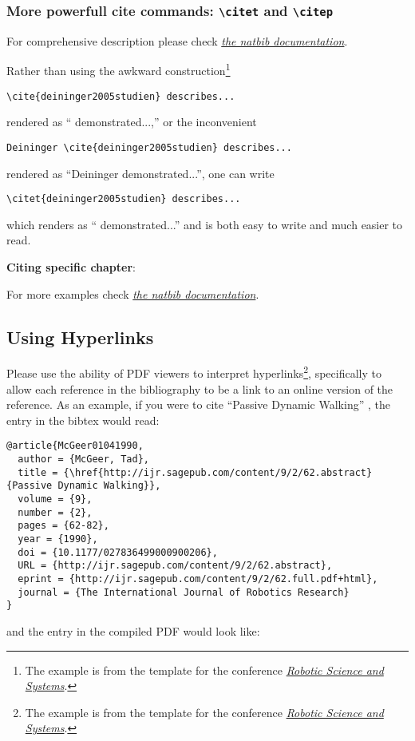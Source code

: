 \subsubsection{More powerfull cite commands: \texttt{\textbackslash citet} and \texttt{\textbackslash citep}}
For comprehensive description please check \href{http://merkel.texture.rocks/Latex/natbib.php}{\textit{the natbib documentation}}.

Rather than using the awkward construction\footnote{The example is from the template for the conference \href{http://www.roboticsconference.org/information/authorinfo/}{\textit{Robotic Science and Systems}}.}
{\small
\begin{verbatim}
\cite{deininger2005studien} describes...
\end{verbatim}
}
\noindent
rendered as ``\cite{deininger2005studien} demonstrated...,'' or the inconvenient
{\small
\begin{verbatim}
Deininger \cite{deininger2005studien} describes...
\end{verbatim}
}
\noindent
rendered as ``Deininger \cite{deininger2005studien} demonstrated...'', one can write
{\small
\begin{verbatim}
\citet{deininger2005studien} describes...
\end{verbatim}
}
\noindent
which renders as ``\citet{deininger2005studien} demonstrated...'' and is
both easy to write and much easier to read.


\textbf{Citing specific chapter}:

\citet[sec. III]{Kroger2008MultiSensor}

\citep[sec. III]{Kroger2008MultiSensor}

For more examples check \href{http://merkel.texture.rocks/Latex/natbib.php}{\textit{the natbib documentation}}.

\subsection{Using Hyperlinks}
Please use the ability of PDF viewers to interpret hyperlinks\footnote{The example is from the template for the conference \href{http://www.roboticsconference.org/information/authorinfo/}{\textit{Robotic Science and Systems}}.}, specifically to allow each reference in the bibliography to be a
link to an online version of the reference.
As an example, if you were to cite ``Passive Dynamic Walking''
\cite{McGeer01041990}, the entry in the bibtex would read:

{\tiny
\begin{verbatim}
@article{McGeer01041990,
  author = {McGeer, Tad},
  title = {\href{http://ijr.sagepub.com/content/9/2/62.abstract}{Passive Dynamic Walking}},
  volume = {9},
  number = {2},
  pages = {62-82},
  year = {1990},
  doi = {10.1177/027836499000900206},
  URL = {http://ijr.sagepub.com/content/9/2/62.abstract},
  eprint = {http://ijr.sagepub.com/content/9/2/62.full.pdf+html},
  journal = {The International Journal of Robotics Research}
}
\end{verbatim}
}
\noindent
and the entry in the compiled PDF would look like:

